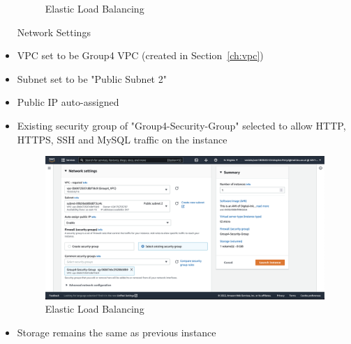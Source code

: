 \begin{itemize}
\begin{figure}
	      \caption{Elastic Load Balancing}
	      \label{fig:elb-type-and-keypair}
	\end{figure}
	Network Settings
	\item VPC set to be Group4 VPC  (created in Section~\ref{ch:vpc})
	\item Subnet set to be "Public Subnet 2"
	\item Public IP auto-assigned
	\item Existing security group of "Group4-Security-Group" selected to allow HTTP, HTTPS, SSH and MySQL traffic on the
	      instance \begin{figure}
	      \centering
	      \includegraphics[width=\textwidth]{resources/elb/elb-instance-2-network-settings.png}
	      \caption{Elastic Load Balancing}
	      \label{fig:elb-instance-2-network-setting}
	\end{figure}
	\item Storage remains the same as previous instance


\end{itemize}
